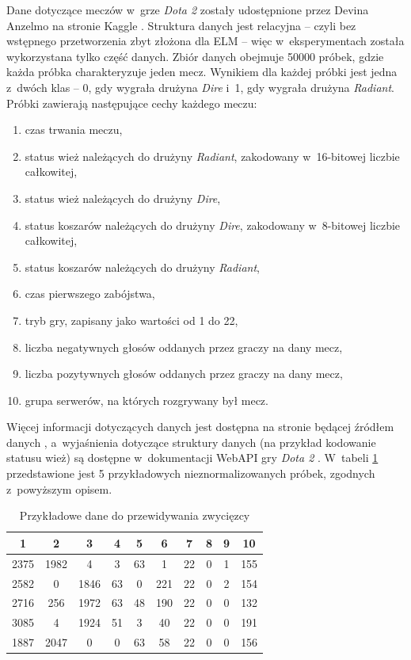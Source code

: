 \documentclass[pl]{minipw} %
\begin{document}
Dane dotyczące meczów w~grze \textit{Dota 2} zostały udostępnione przez Devina Anzelmo na stronie Kaggle \cite{dota2}. Struktura danych jest relacyjna -- czyli bez wstępnego przetworzenia zbyt złożona dla ELM -- więc w~eksperymentach została wykorzystana tylko część danych. Zbiór danych obejmuje 50000 próbek, gdzie każda próbka charakteryzuje jeden mecz.  Wynikiem dla każdej próbki jest jedna z~dwóch klas -- 0, gdy wygrała drużyna \textit{Dire} i~1, gdy wygrała drużyna \textit{Radiant}. Próbki zawierają następujące cechy każdego meczu:
\begin{enumerate}
\item czas trwania meczu,
\item status wież należących do drużyny \textit{Radiant}, zakodowany w~16-bitowej liczbie całkowitej,
\item status wież należących do drużyny \textit{Dire},
\item status koszarów należących do drużyny \textit{Dire}, zakodowany w~8-bitowej liczbie całkowitej,
\item status koszarów należących do drużyny \textit{Radiant},
\item czas pierwszego zabójstwa,
\item tryb gry, zapisany jako wartości od 1 do 22,
\item liczba negatywnych głosów oddanych przez graczy na dany mecz,
\item liczba pozytywnych głosów oddanych przez graczy na dany mecz,
\item grupa serwerów, na których rozgrywany był mecz.
\end{enumerate}
Więcej informacji dotyczących danych jest dostępna na stronie będącej źródłem danych \cite{dota2}, a~wyjaśnienia dotyczące struktury danych (na przykład kodowanie statusu wież) są dostępne w~dokumentacji WebAPI gry \textit{Dota 2} \cite{dota2_webapi}. W~tabeli \ref{dota2_first_5} przedstawione jest 5 przykładowych nieznormalizowanych próbek, zgodnych z~powyższym opisem.
\begin{table}[H]
\caption{Przykładowe dane do przewidywania zwycięzcy}
\label{dota2_first_5}
\centering
\begin{tabular}{|c|c|c|c|c|c|c|c|c|c|}
\hline
\textbf{1} & \textbf{2} & \textbf{3} & \textbf{4} & \textbf{5} & \textbf{6} & \textbf{7} & \textbf{8} & \textbf{9} & \textbf{10} \\
\hline
2375 & 1982 & 4 & 3 & 63 & 1 & 22 & 0 & 1 & 155 \\
2582 & 0 & 1846 & 63 & 0 & 221 & 22 & 0 & 2 & 154 \\
2716 & 256 & 1972 & 63 & 48 & 190 & 22 & 0 & 0 & 132 \\
3085 & 4 & 1924 & 51 & 3 & 40 & 22 & 0 & 0 & 191 \\
1887 & 2047 & 0 & 0 & 63 & 58 & 22 & 0 & 0 & 156 \\
\hline
\end{tabular}
\end{table}
\end{document}
